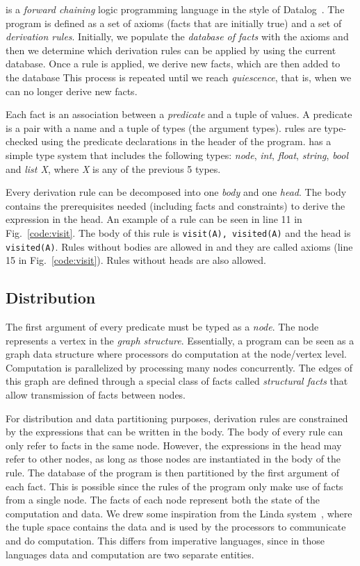 \lang is a \emph{forward chaining} logic programming language in the style of Datalog~\cite{Ullman:1990:PDK:533142}. The program is defined as a set of axioms (facts that are initially true) and a set of \emph{derivation rules}. Initially, we populate the \emph{database of facts} with the axioms and then we determine which derivation rules can be applied by using the current database. Once a rule is applied, we derive new facts, which are then added to the database
This process is repeated until we reach \emph{quiescence}, that is, when we can no longer derive new facts.

Each fact is an association between a \emph{predicate} and a tuple of values. A predicate is a pair with a name and a tuple of types (the argument types). \lang rules are type-checked using the predicate declarations in the header of the program. \lang has a simple type system that includes the following types: \emph{node}, \emph{int}, \emph{float}, \emph{string}, \emph{bool} and \emph{list X}, where \emph{X} is any of the previous 5 types.

Every derivation rule can be decomposed into one \emph{body} and one \emph{head}.
The body contains the prerequisites needed (including facts and constraints) to derive the expression in the head.
An example of a rule can be seen in line 11 in Fig.~\ref{code:visit}.
The body of this rule is \texttt{visit(A), visited(A)} and the head is \texttt{visited(A)}.
Rules without bodies are allowed in \lang and they are called axioms (line 15 in Fig.~\ref{code:visit}). Rules without heads are also allowed.

\subsection{Distribution}

The first argument of every predicate must be typed as a \emph{node}. The node represents a vertex in the \emph{graph structure}.
Essentially, a program can be seen as a graph data structure where processors do computation at the node/vertex level. Computation is
parallelized by processing many nodes concurrently. The edges of this graph are defined through a special class of facts called \emph{structural facts}
that allow transmission of facts between nodes.

For distribution and data partitioning purposes, derivation rules are constrained by the expressions that can be written in the body.
The body of every rule can only refer to facts in the same node.
However, the expressions in the head may refer to other nodes, as long as those nodes are instantiated in the body of the rule.
The database of the program is then partitioned by the first argument of each fact. This is possible since the rules of the
program only make use of facts from a single node. The facts of each node represent both the state of the computation and data.
We drew some inspiration from the Linda system~\cite{1663305}, where the tuple space contains the data and is used by the processors
to communicate and do computation.
This differs from imperative languages, since in those languages data and computation are two separate entities.


